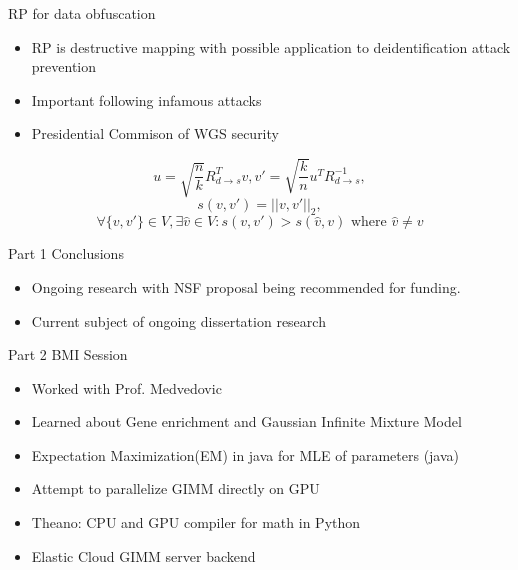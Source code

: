 \documentclass{beamer}
\begin{document}
\begin{frame}{RP for data obfuscation}
 \begin{itemize}
  \item RP is destructive mapping with possible application to deidentification attack prevention
  \item Important following infamous attacks
  \item Presidential Commison of WGS security\cite{presidential}
 \end{itemize}

$$ u = \sqrt{{\frac{n}{k}}}R_{d\rightarrow s}^Tv ,
v' = \sqrt{{\frac{k}{n}}}u^T R_{d\rightarrow s}^{-1}, $$
$$s(v,v') = ||v,v'||_{2}, $$
$$
\forall\{v,v'\} \in V , \exists {\hat{v}} \in V : s(v,v')>s(\hat{v},v) \text{ where } \hat{v}\neq v
$$
\end{frame}
\begin{frame}{Part 1 Conclusions}
 \begin{itemize}
  \item Ongoing research with NSF proposal being recommended for funding.
  \item Current subject of ongoing dissertation research
 \end{itemize}
\end{frame}
\begin{frame}{Part 2 BMI Session}
\begin{itemize}
 \item Worked with Prof. Medvedovic
 \item Learned about Gene enrichment and Gaussian Infinite Mixture Model
 \item Expectation Maximization(EM) in java for MLE of parameters (java)
 \item Attempt to parallelize GIMM directly on GPU
 \item Theano: CPU and GPU compiler for math in Python
 \item Elastic Cloud GIMM server backend
 \end{itemize}
\end{frame}
\end{document}
